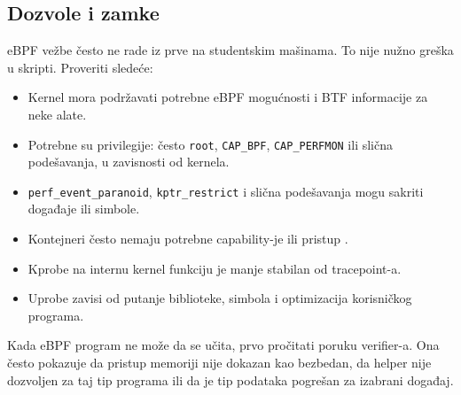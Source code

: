 \subsection{Dozvole i zamke}\label{ebpf-dozvole-zamke}

eBPF vežbe često ne rade iz prve na studentskim mašinama. To nije nužno greška u skripti. Proveriti sledeće:

\begin{itemize}
\tightlist
\item
  Kernel mora podržavati potrebne eBPF mogućnosti i BTF informacije za neke alate.
\item
  Potrebne su privilegije: često \texttt{root}, \texttt{CAP\_BPF}, \texttt{CAP\_PERFMON} ili slična podešavanja, u zavisnosti od kernela.
\item
  \texttt{perf\_event\_paranoid}, \texttt{kptr\_restrict} i slična podešavanja mogu sakriti događaje ili simbole.
\item
  Kontejneri često nemaju potrebne capability-je ili pristup .
\item
  Kprobe na internu kernel funkciju je manje stabilan od tracepoint-a.
\item
  Uprobe zavisi od putanje biblioteke, simbola i optimizacija korisničkog programa.
\end{itemize}

Kada eBPF program ne može da se učita, prvo pročitati poruku verifier-a. Ona često pokazuje da pristup memoriji nije dokazan kao bezbedan, da helper nije dozvoljen za taj tip programa ili da je tip podataka pogrešan za izabrani događaj.
